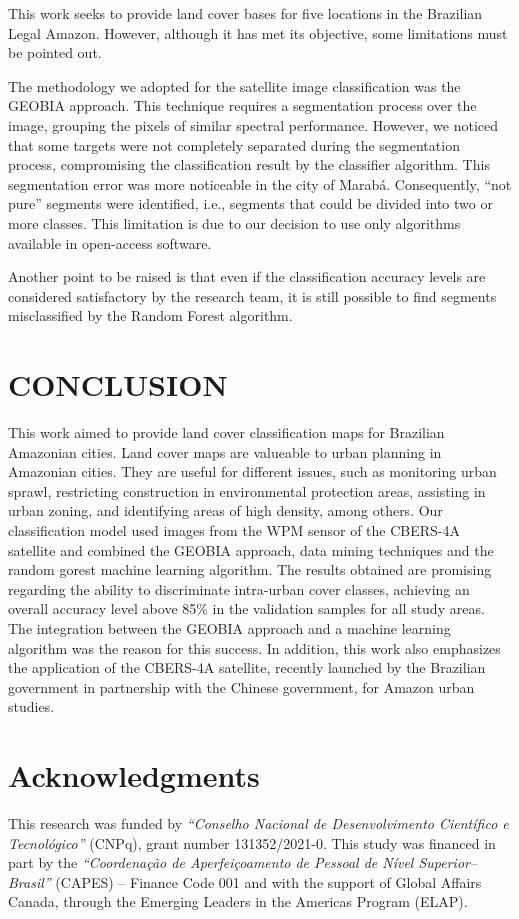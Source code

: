 \documentclass[preprint, 3p,
authoryear]{elsarticle} %
\begin{document}
This work seeks to provide land cover bases for five locations in the
Brazilian Legal Amazon. However, although it has met its objective, some
limitations must be pointed out.

The methodology we adopted for the satellite image classification was
the GEOBIA approach. This technique requires a segmentation process over
the image, grouping the pixels of similar spectral performance. However,
we noticed that some targets were not completely separated during the
segmentation process, compromising the classification result by the
classifier algorithm. This segmentation error was more noticeable in the
city of Marabá. Consequently, ``not pure'' segments were identified,
i.e., segments that could be divided into two or more classes. This
limitation is due to our decision to use only algorithms available in
open-access software.

Another point to be raised is that even if the classification accuracy
levels are considered satisfactory by the research team, it is still
possible to find segments misclassified by the Random Forest algorithm.

\hypertarget{conclusion}{%
\section{CONCLUSION}\label{conclusion}}

This work aimed to provide land cover classification maps for Brazilian
Amazonian cities. Land cover maps are valueable to urban planning in
Amazonian cities. They are useful for different issues, such as
monitoring urban sprawl, restricting construction in environmental
protection areas, assisting in urban zoning, and identifying areas of
high density, among others. Our classification model used images from
the WPM sensor of the CBERS-4A satellite and combined the GEOBIA
approach, data mining techniques and the random gorest machine learning
algorithm. The results obtained are promising regarding the ability to
discriminate intra-urban cover classes, achieving an overall accuracy
level above 85\% in the validation samples for all study areas. The
integration between the GEOBIA approach and a machine learning algorithm
was the reason for this success. In addition, this work also emphasizes
the application of the CBERS-4A satellite, recently launched by the
Brazilian government in partnership with the Chinese government, for
Amazon urban studies.

\hypertarget{acknowledgments}{%
\section{Acknowledgments}\label{acknowledgments}}

This research was funded by \emph{``Conselho Nacional de Desenvolvimento
Científico e Tecnológico''} (CNPq), grant number 131352/2021-0. This
study was financed in part by the \emph{``Coordenação de Aperfeiçoamento
de Pessoal de Nível Superior--Brasil''} (CAPES) -- Finance Code 001 and
with the support of Global Affairs Canada, through the Emerging Leaders
in the Americas Program (ELAP).


\end{document}
